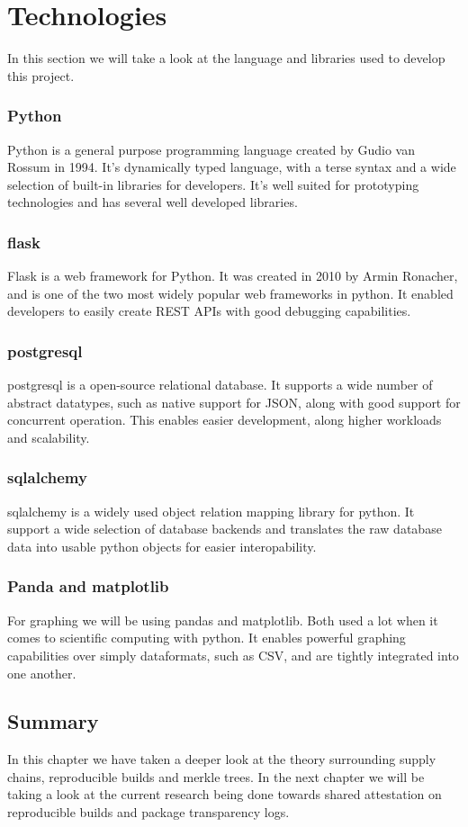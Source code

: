 \documentclass[../Main/thesis.tex]{subfiles}
\begin{document}
\chapter{Technologies}\label{ch:technologies}
In this section we will take a look at the language and libraries used to
develop this project.

\subsection*{Python}
Python is a general purpose programming language created by Gudio van Rossum in
1994. It's dynamically typed language, with a terse syntax and a wide selection
of built-in libraries for developers. It's well suited for prototyping
technologies and has several well developed libraries.

\subsection*{flask}
Flask is a web framework for Python. It was created in 2010 by Armin Ronacher,
and is one of the two most widely popular web frameworks in python. It enabled
developers to easily create REST APIs with good debugging capabilities.

\subsection*{postgresql}
postgresql is a open-source relational database. It supports a wide number of
abstract datatypes, such as native support for JSON, along with good support for
concurrent operation. This enables easier development, along higher workloads
and scalability.

\subsection*{sqlalchemy}
sqlalchemy is a widely used object relation mapping library for python. It
support a wide selection of database backends and translates the raw database
data into usable python objects for easier interopability.

\subsection*{Panda and matplotlib}
For graphing we will be using pandas and matplotlib. Both used a lot when it
comes to scientific computing with python. It enables powerful graphing
capabilities over simply dataformats, such as CSV, and are tightly integrated
into one another.

\section*{Summary}\label{sec:summary-technologies} 
In this chapter we have taken a deeper look at the theory surrounding supply
chains, reproducible builds and merkle trees. In the next chapter we will be
taking a look at the current research being done towards shared attestation on
reproducible builds and package transparency logs.

\blankpage
\end{document}
